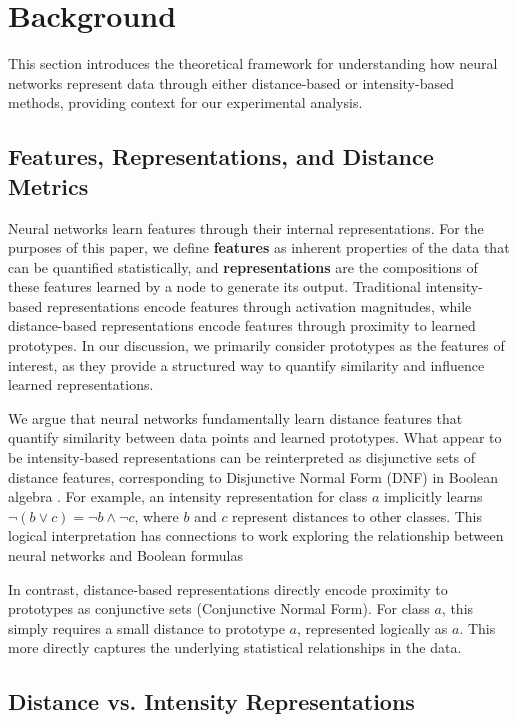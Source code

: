 \section{Background}
\label{sec:background}

This section introduces the theoretical framework for understanding how neural networks represent data through either distance-based or intensity-based methods, providing context for our experimental analysis.

\subsection{Features, Representations, and Distance Metrics}

Neural networks learn features through their internal representations. For the purposes of this paper, we define \textbf{features} as inherent properties of the data that can be quantified statistically, and \textbf{representations} are the compositions of these features learned by a node to generate its output. Traditional intensity-based representations encode features through activation magnitudes, while distance-based representations encode features through proximity to learned prototypes. In our discussion, we primarily consider prototypes as the features of interest, as they provide a structured way to quantify similarity and influence learned representations.

We argue that neural networks fundamentally learn distance features that quantify similarity between data points and learned prototypes. What appear to be intensity-based representations can be reinterpreted as disjunctive sets of distance features, corresponding to Disjunctive Normal Form (DNF) in Boolean algebra \cite{post1921introduction}. For example, an intensity representation for class $a$ implicitly learns $\lnot(b \lor c) = \lnot b \land \lnot c$, where $b$ and $c$ represent distances to other classes. This logical interpretation has connections to work exploring the relationship between neural networks and Boolean formulas \cite{anthony2003boolean}

In contrast, distance-based representations directly encode proximity to prototypes as conjunctive sets (Conjunctive Normal Form). For class $a$, this simply requires a small distance to prototype $a$, represented logically as $a$. This more directly captures the underlying statistical relationships in the data.

\subsection{Distance vs. Intensity Representations}
\label{subsec:dist-intensity-rep}

